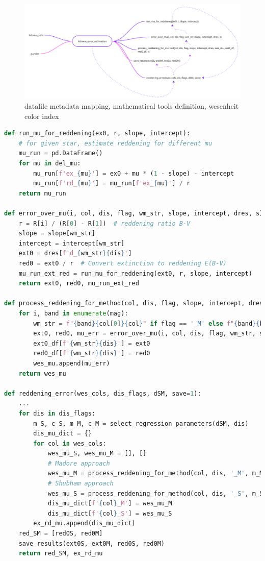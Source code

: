 \documentclass{article}
\begin{document}
\begin{figure}[h!]
\caption{\small datafile metadata mapping, mathematical tools definition, wesenheit color index}
\includegraphics[width=\textwidth]{./figures/e_error_estimation.png}
\end{figure}

\begin{lstlisting}[language=Python, caption=dependencies for main.py]
def run_mu_for_reddening(ex0, r, slope, intercept):
    # for given star, estimate reddening for different mu
    mu_run = pd.DataFrame() 
    for mu in del_mu:
        mu_run[f'ex_{mu}'] = ex0 + mu * (1 - slope) - intercept
        mu_run[f'rd_{mu}'] = mu_run[f'ex_{mu}'] / r
    return mu_run

def error_over_mu(i, col, dis, flag, wm_str, slope, intercept, dres, s):
    r = R[i] / (R[0] - R[1])  # reddening ratio B-V
    slope = slope[wm_str]
    intercept = intercept[wm_str]
    ext0 = dres[f'd_{wm_str}{dis}']
    red0 = ext0 / r  # Convert extinction to reddening E(B-V)
    mu_run_ext_red = run_mu_for_reddening(ext0, r, slope, intercept)
    return ext0, red0, mu_run_ext_red

def process_reddening_for_method(col, dis, flag, slope, intercept, dres, wes_mu, ext0_df, red0_df, s):
    for i, band in enumerate(mag):
        wm_str = f"{band}{col[0]}{col}" if flag == '_M' else f"{band}{band}{col}"
        ext0, red0, mu_err = error_over_mu(i, col, dis, flag, wm_str, slope, intercept, dres, s)        
        ext0_df[f'{wm_str}{dis}'] = ext0
        red0_df[f'{wm_str}{dis}'] = red0
        wes_mu.append(mu_err)
    return wes_mu

def reddening_error(wes_cols, dis_flags, dSM, save=1):
    ...
    for dis in dis_flags:
        m_S, c_S, m_M, c_M = select_regression_parameters(dSM, dis)
        dis_mu_dict = {}
        for col in wes_cols:
            wes_mu_S, wes_mu_M = [], []
            # Madore approach
            wes_mu_M = process_reddening_for_method(col, dis, '_M', m_M, c_M, dSM[1][1], wes_mu_M, ext0M, red0M, save)       
            # Shubham approach
            wes_mu_S = process_reddening_for_method(col, dis, '_S', m_S, c_S, dSM[1][0], wes_mu_S, ext0S, red0S, save)
            dis_mu_dict[f'{col}_M'] = wes_mu_M
            dis_mu_dict[f'{col}_S'] = wes_mu_S
        ex_rd_mu.append(dis_mu_dict)
    red_SM = [red0S, red0M]
    save_results(ext0S, ext0M, red0S, red0M)
    return red_SM, ex_rd_mu


\end{lstlisting}
\end{document}
